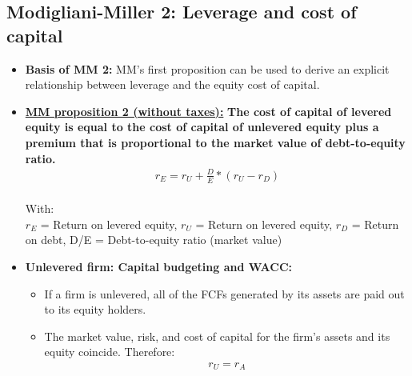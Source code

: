\documentclass[ieeetran]{article}
\begin{document}
\subsection{Modigliani-Miller 2: Leverage and cost of capital} %
\label{sub:modigliani_miller_2_leverage_and_cost_of_capital}

\begin{itemize}
  \item \textbf{Basis of MM 2:} MM's first proposition can be used to derive an explicit relationship between leverage and the equity cost of capital.

\item \textbf{\underline{MM proposition 2 (without taxes):}} \textbf{The cost of capital of levered equity is equal to the cost of capital of unlevered equity plus a premium that is proportional to the market value of debt-to-equity ratio.}
	\large
	\begin{equation*}
	\boxed{
	\begin{aligned}
r_E = r_U + \frac{D}{E} * (r_U - r_D)	
	\end{aligned}
	}
	\end{equation*}
	\\
	\normalsize
	With:\\
	$r_E$ = Return on levered equity, $r_U$ = Return on levered equity, $r_D$ = Return on debt, D/E = Debt-to-equity ratio (market value)
	
\item \textbf{Unlevered firm: Capital budgeting and WACC:}
	\begin{itemize}
	  \item If a firm is unlevered, all of the FCFs generated by its assets are paid out to its equity holders.
	\item The market value, risk, and cost of capital for the firm's assets and its equity coincide. Therefore:
		\large
		\begin{equation*}
		\boxed{
		\begin{aligned}
	r_U = r_A	
		\end{aligned}
		}
		\end{equation*}
		\normalsize
		
	\end{itemize}


\end{itemize}
\end{document}
